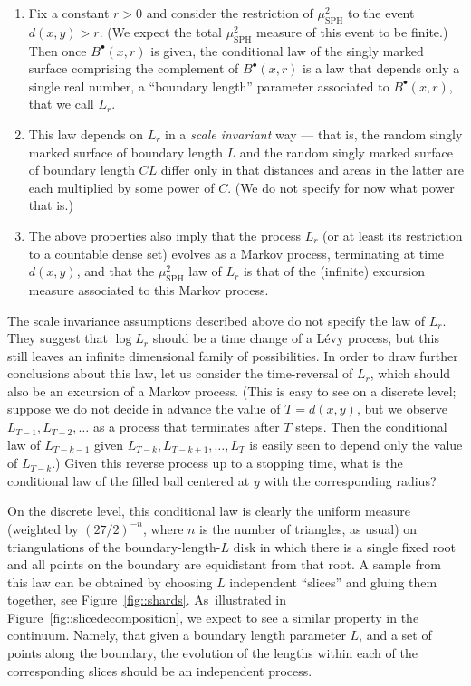 \documentclass[10pt]{amsart}
\newcommand{\sbullet}{{\scriptscriptstyle\bullet}}
\theoremstyle{plain}
\numberwithin{theorem}{section}
\theoremstyle{definition}
\newcommand{\mustwo}{\mu_{\mathrm{SPH}}^2}
\newcommand{\fb}[2]{B^\sbullet(#1,#2)}
\begin{document}
\begin{enumerate}
\item Fix a constant $r > 0$ and consider the restriction of $\mustwo$ to the event $d(x,y) > r$. (We expect the total $\mustwo$ measure of this event to be finite.) Then once $\fb{x}{r}$ is given, the conditional law of the singly marked surface comprising the complement of $\fb{x}{r}$ is a law that depends only a single real number, a ``boundary length'' parameter associated to $\fb{x}{r}$, that we call $L_r$.
\item This law depends on $L_r$ in a \emph{scale invariant} way --- that is, the random singly marked surface of boundary length $L$ and the random singly marked surface of boundary length $CL$ differ only in that distances and areas in the latter are each multiplied by some power of $C$. (We do not specify for now what power that is.)
\item The above properties also imply that the process $L_r$ (or at least its restriction to a countable dense set) evolves as a Markov process, terminating at time $d(x,y)$, and that the $\mustwo$ law of $L_r$ is that of the (infinite) excursion measure associated to this Markov process.
\end{enumerate}

The scale invariance assumptions described above do not specify the law of $L_r$. They suggest that $\log L_r$ should be a time change of a Lévy process, but this still leaves an infinite dimensional family of possibilities. In order to draw further conclusions about this law, let us consider the time-reversal of $L_r$, which should also be an excursion of a Markov process. (This is easy to see on a discrete level; suppose we do not decide in advance the value of $T =d(x,y)$, but we observe $L_{T-1}, L_{T-2}, \ldots$ as a process that terminates after $T$ steps. Then the conditional law of $L_{T-k-1}$ given $L_{T-k},L_{T-k+1},\ldots,L_T$ is easily seen to depend only the value of $L_{T-k}$.) Given this reverse process up to a stopping time, what is the conditional law of the filled ball centered at $y$ with the corresponding radius?

On the discrete level, this conditional law is clearly the uniform measure (weighted by $(27/2)^{-n}$, where $n$ is the number of triangles, as usual) on triangulations of the boundary-length-$L$ disk in which there is a single fixed root and all points on the boundary are equidistant from that root. A sample from this law can be obtained by choosing $L$ independent ``slices'' and gluing them together, see Figure~\ref{fig::shards}. As~illustrated in Figure~\ref{fig::slicedecomposition}, we expect to see a similar property in the continuum. Namely, that given a boundary length parameter $L$, and a set of points along the boundary, the evolution of the lengths within each of the corresponding slices should be an independent process.
\end{document}
